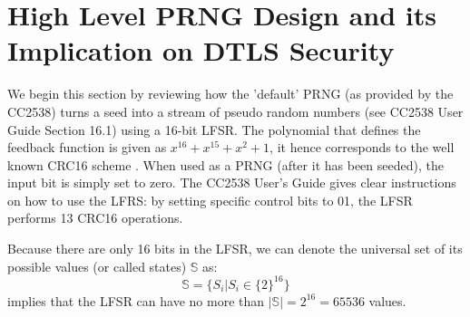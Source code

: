 \section{High Level PRNG Design and its Implication on DTLS Security} \label{LFSR}
We begin this section by reviewing how the 'default' PRNG (as provided by the CC2538) turns a seed into a stream of pseudo random numbers (see CC2538 User Guide\cite{CC2538Manual} Section 16.1) using a 16-bit LFSR. The polynomial that defines the feedback function is given as $x^{16} + x^{15} + x^{2} + 1$, it hence corresponds to the well known CRC16 scheme \cite{CRC}. When used as a PRNG (after it has been seeded), the input bit is simply set to zero. The CC2538 User's Guide\cite{CC2538Manual} gives clear instructions on how to use the LFRS: by setting specific control bits to 01, the LFSR performs 13 CRC16 operations. 






Because there are only 16 bits in the LFSR, we can denote the universal set of its  possible values (or called states) $\mathbb{S}$ as:
\begin{equation} \label{PRNGState}
\mathbb{S} = \{ S_{i} | S_{i} \in \{2\}^{16}\}
\end{equation}
 implies that the LFSR can have no more than $|\mathbb{S}| = 2^{16} = 65536$ values.

